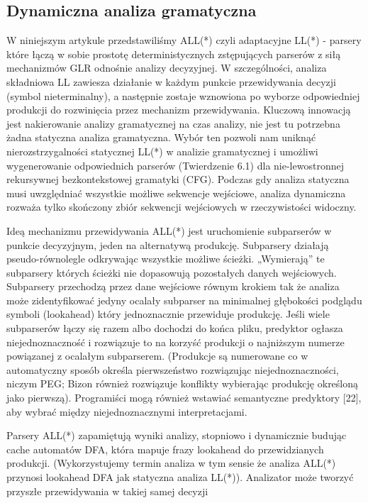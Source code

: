 ﻿\subsection{Dynamiczna analiza gramatyczna}
W niniejszym artykule przedstawiliśmy ALL(*) czyli adaptacyjne LL(*) - parsery
które łączą w sobie prostotę deterministycznych zstępujących parserów z
siłą mechanizmów GLR odnośnie analizy decyzyjnej.
W szczególności, analiza składniowa LL zawiesza działanie w każdym punkcie
przewidywania decyzji (symbol nieterminalny), a następnie zostaje wznowiona
po wyborze odpowiedniej produkcji do rozwinięcia przez mechanizm przewidywania.
Kluczową innowacją jest nakierowanie analizy gramatycznej na czas analizy,
nie jest tu potrzebna żadna statyczna analiza gramatyczna.
Wybór ten pozwoli nam uniknąć nierozstrzygalności statycznej LL(*) w analizie
gramatycznej i umożliwi wygenerowanie odpowiednich parserów (Twierdzenie 6.1)
dla nie-lewostronnej rekursywnej bezkontekstowej gramatyki (CFG).
Podczas gdy analiza statyczna musi uwzględniać wszystkie możliwe sekwencje
wejściowe, analiza dynamiczna rozważa tylko skończony zbiór sekwencji
wejściowych w rzeczywistości widoczny.
\par
Ideą mechanizmu przewidywania ALL(*) jest uruchomienie subparserów w punkcie
decyzyjnym, jeden na alternatywą produkcję.
Subparsery działają pseudo-równolegle odkrywając wszystkie możliwe ścieżki.
„Wymierają” te subparsery których ścieżki nie dopasowują pozostałych
danych wejściowych.
Subparsery przechodzą przez dane wejściowe równym krokiem tak że analiza może
zidentyfikować jedyny ocalały subparser na minimalnej głębokości podglądu
symboli (lookahead) który jednoznacznie przewiduje produkcję.
Jeśli wiele subparserów łączy się razem albo dochodzi do końca pliku, predyktor
ogłasza niejednoznaczność i rozwiązuje to na korzyść produkcji o najniższym
numerze powiązanej z ocalałym subparserem.
(Produkcje są numerowane co w automatyczny sposób określa pierwszeństwo
rozwiązując niejednoznaczności, niczym PEG; Bizon również rozwiązuje konflikty
wybierając produkcję określoną jako pierwszą).
Programiści mogą również wstawiać semantyczne predyktory [22], aby wybrać
między niejednoznacznymi interpretacjami.
\par
Parsery ALL(*) zapamiętują wyniki analizy, stopniowo i dynamicznie budując
cache automatów DFA, która mapuje frazy lookahead do przewidzianych produkcji.
(Wykorzystujemy termin analiza w tym sensie że analiza ALL(*) przynosi
lookahead DFA jak statyczna analiza LL(*)).
Analizator może tworzyć przyszłe przewidywania w takiej samej decyzji
